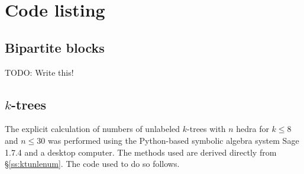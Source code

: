 \documentclass[distribution,draft]{brandiss} %
\numberwithin{section}{chapter}
\numberwithin{figure}{chapter}
\begin{document}
\chapter{Code listing}\label{c:code}
\section{Bipartite blocks}\label{s:bpbcode}
TODO: Write this!

\section{$k$-trees}\label{s:ktcode}
The explicit calculation of numbers of unlabeled $k$-trees with $n$ hedra for $k \leq 8$ and $n \leq 30$ was performed using the Python-based symbolic algebra system Sage 1.7.4 \cite{sage} and a desktop computer.
The methods used are derived directly from \S \ref{ss:ktunlenum}.
The code used to do so follows.



\backmatter



\end{document}
